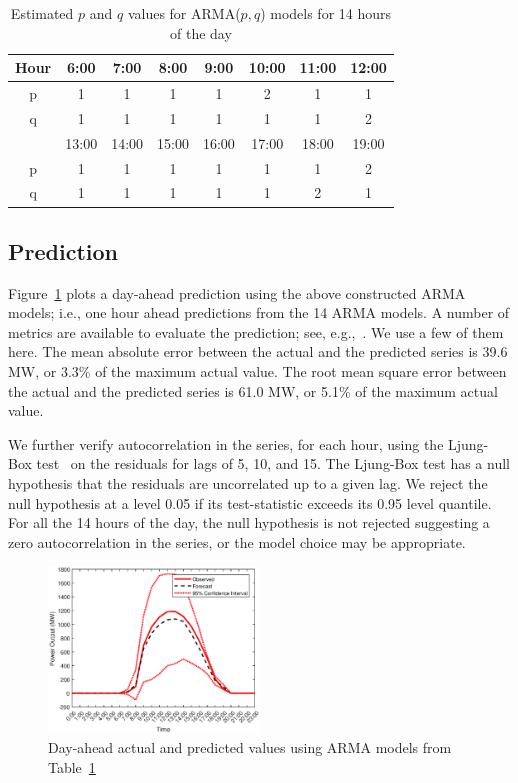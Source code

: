 \documentclass[letter]{IEEEtran}
\begin{document}
\begin{table}[!htb]
\centering
\caption{Estimated $p$ and $q$ values for ARMA($p,q$) models for 14 hours of 
the day}
\label{tab:order}
{\renewcommand{\arraystretch}{1.1}
\begin{tabular}{c| ccccccc}
\toprule 
Hour & 6:00 & 7:00 & 8:00 & 9:00 & 10:00 & 11:00 & 12:00  \\ \toprule
p    & 1    & 1    & 1    & 1    & 2     & 1     & 1       \\ \hline
q    & 1    & 1    & 1    & 1    & 1     & 1     & 2      \\ \midrule

& 13:00 & 14:00 & 15:00 & 16:00 & 17:00 & 18:00 & 19:00  \\ \toprule
p   & 1     & 1     & 1     & 1     & 1     & 1     & 2 \\ \hline
q    & 1     & 1     & 1    & 1     & 1     & 2     & 1  \\ \bottomrule
\end{tabular}}
\end{table}


\subsection{Prediction}

Figure~\ref{fig:prediction} plots a day-ahead prediction using the above 
constructed ARMA models; i.e., one hour ahead predictions from the 14 ARMA 
models. A number of metrics are available to evaluate the prediction; see, 
e.g.,~\cite{coimbra2013overview}. We use a few of them here. The mean absolute 
error between the actual 
and the predicted series is 
39.6 MW, or  3.3\% of the maximum actual value. The root mean square 
error between the actual and the predicted series is 
61.0 MW, or  5.1\% of the maximum actual value. 

We further verify autocorrelation in the series, for each hour, using the 
Ljung-Box test~\cite{ljung1978measure} on the residuals for lags of 5, 10, 
and 15. The Ljung-Box  test has a 
null hypothesis that the residuals are uncorrelated up to a 
given lag. We reject the null hypothesis at a level 0.05 if its test-statistic 
exceeds its 
0.95 level quantile. For all the 14 hours of the day, the null hypothesis is not
rejected suggesting a zero autocorrelation in the series, or the 
model choice may be appropriate. 


\begin{figure}[!t]
\centering
\includegraphics[width=0.5\textwidth]{prediction.eps}
\caption{Day-ahead actual and predicted values using ARMA models from 
Table~\ref{tab:order}}
 \label{fig:prediction}
\end{figure}
\end{document}
